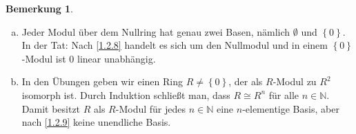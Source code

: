 \documentclass[
twoside=semi,
fontsize=12,
DIV=12, 
cleardoublepage=current,
leqno,
headings=optiontoheadandtoc, 
toc=idx
]{scrbook}
\newcommand{\N}{\mathbb{N}}
\newcommand{\set}[1]{\left\{ #1 \right\}}
\theoremstyle{definition}
\newtheorem{bemerkung}[definition]{Bemerkung}
\begin{document}
	\begin{bemerkung}\label{1.2.10}\hfill
		\begin{enumerate}[(a)]
			\item 
			Jeder Modul \"uber dem Nullring hat genau zwei Basen, n\"amlich $\emptyset$ und $\set{0}$. In der Tat: Nach \ref{1.2.8} handelt es sich um den Nullmodul und in einem $\set{0}$-Modul ist $0$ linear unabh\"angig.
			\item In den \"Ubungen geben wir einen Ring $R \neq \set{0}$, der als $R$-Modul zu $R^2$ isomorph ist. Durch Induktion schlie\ss t man, dass $R \cong R^n$ f\"ur alle $n \in \N$. Damit besitzt $R$ als $R$-Modul f\"ur jedes $n \in \N$ eine $n$-elementige Basis, aber nach \ref{1.2.9} keine unendliche Basis.
		\end{enumerate}
	\end{bemerkung}
\end{document}
